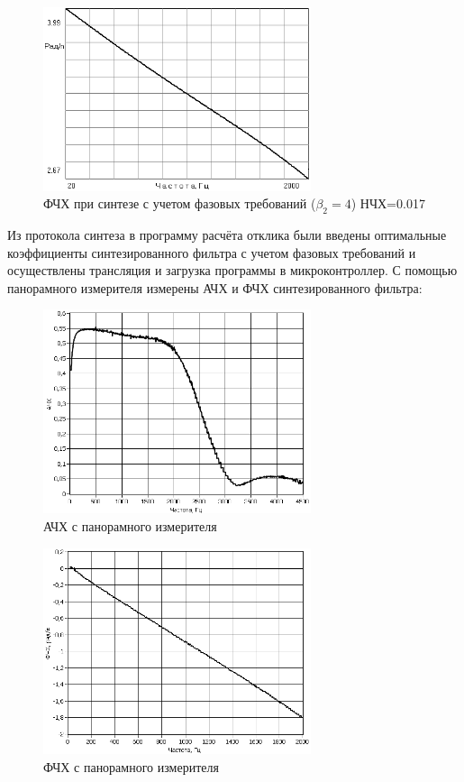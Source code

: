\documentclass[a4paper,14pt]{extarticle}
\begin{document}
\begin{figure}[H]
  \centering
  \includegraphics[width=0.7\textwidth]{Z4_FN4/phase_4.png}
  \caption{ФЧХ при синтезе с учетом фазовых требований ($\beta_2=4$) НЧХ=0.017}
  \label{fig:}
\end{figure}

Из протокола синтеза в программу расчёта отклика были введены оптимальные коэффициенты синтезированного фильтра с учетом фазовых требований и осуществлены трансляция и загрузка программы в микроконтроллер. С помощью панорамного измерителя  измерены АЧХ и ФЧХ синтезированного фильтра:

\begin{figure}[H]
  \centering
  \includegraphics[width=0.7\textwidth]{Z4_FN4/pan_gain_4.png}
  \caption{АЧХ с панорамного измерителя}
  \label{fig:}
\end{figure}

\begin{figure}[H]
  \centering
  \includegraphics[width=0.7\textwidth]{Z4_FN4/pan_phase_4.png}
  \caption{ФЧХ с панорамного измерителя}
  \label{fig:}
\end{figure}
\end{document}
